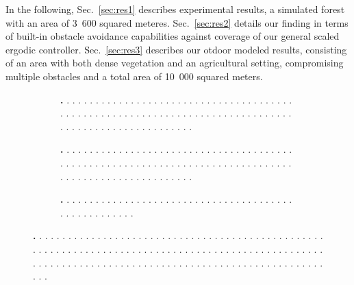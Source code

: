 \documentclass[letterpaper,10pt,conference,twoside]{IEEEtran}
\theoremstyle{definition}
\begin{document}
In the following, Sec.~\ref{sec:res1} describes experimental results, a simulated forest with an area of 3~600 squared meteres. Sec.~\ref{sec:res2} details our finding in terms of built-in obstacle avoidance capabilities against coverage of our general scaled ergodic controller. Sec.~\ref{sec:res3} describes our otdoor modeled results, consisting of an area with both dense vegetation and an agricultural setting, compromising multiple obstacles and a total area of 10~000 squared meters.

\begin{figure}[t!]
  \centering
  \begin{subfigure}[t]{\linewidth}
  \hspace*{-.15cm}
  \caption{\textbf{.   }.   .   .   .   .   .   .   .   .   .   .   .   .   .   .   .   .   .   .   .   .   .   .   .   .   .   .   .   .   .   .   .   .   .   .   .   .   .   .   .   .   .   .   .   .   .   .   .   .   .   .   .   .   .   .   .   .   .   .   .   .   .   .   .   .   .   .   .   .   .   .   .   .   .   .   .   .   .   .   .   .   .   .   .   .   .   .   .   .   .   .   .   .   .   .   .   .   .   .   .   .   .}
  \label{fig:1-1}
  \end{subfigure}
  \vspace*{.1cm}
  \begin{subfigure}[t]{\linewidth}
  \hspace*{-.15cm}
  \caption{\textbf{.   }.   .   .   .   .   .   .   .   .   .   .   .   .   .   .   .   .   .   .   .   .   .   .   .   .   .   .   .   .   .   .   .   .   .   .   .   .   .   .   .   .   .   .   .   .   .   .   .   .   .   .   .   .   .   .   .   .   .   .   .   .   .   .   .   .   .   .   .   .   .   .   .   .   .   .   .   .   .   .   .   .   .   .   .   .   .   .   .   .   .   .   .   .   .   .   .   .   .   .   .   .   .}
  \label{fig:1-2}
  \end{subfigure}
  \vspace*{.1cm}
  \begin{subfigure}[t]{\linewidth}
  \hspace*{-.15cm}
  \caption{\textbf{.   }.   .   .   .   .   .   .   .   .   .   .   .   .   .   .   .   .   .   .   .   .   .   .   .   .   .   .   .   .   .   .   .   .   .   .   .   .   .   .   .   .   .   .   .   .   .   .   .   .   .   .   .}
  \label{fig:1-3}
  \end{subfigure}
  \caption[.]{\textbf{.   }.   .   .   .   .   .   .   .   .   .   .   .   .   .   .   .   .   .   .   .   .   .   .   .   .   .   .   .   .   .   .   .   .   .   .   .   .   .   .   .   .   .   .   .   .   .   .   .   .   .   .   .   .   .   .   .   .   .   .   .   .   .   .   .   .   .   .   .   .   .   .   .   .   .   .   .   .   .   .   .   .   .   .   .   .   .   .   .   .   .   .   .   .   .   .   .   .   .   .   .   .   .   .   .   .   .   .   .   .   .   .   .   .   .   .   .   .   .   .   .   .   .   .   .   .   .   .   .   .   .   .   .   .   .   .   .   .   .   .   .   .   .   .   .   .   .   .   .   .   .   .   .}
  \label{fig:1}
\end{figure}
\end{document}

